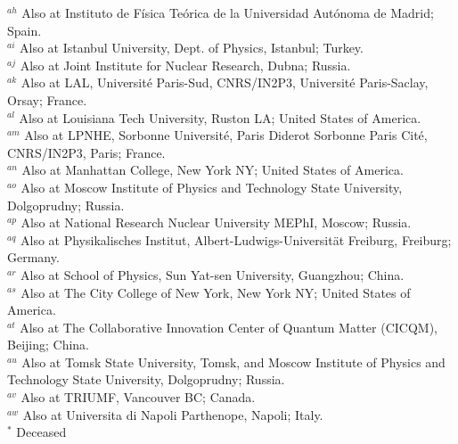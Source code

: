 \begin{flushleft}
$^{ah}$ Also at Instituto de Física Teórica de la Universidad Autónoma de Madrid; Spain.\\
$^{ai}$ Also at Istanbul University, Dept. of Physics, Istanbul; Turkey.\\
$^{aj}$ Also at Joint Institute for Nuclear Research, Dubna; Russia.\\
$^{ak}$ Also at LAL, Universit\'e Paris-Sud, CNRS/IN2P3, Universit\'e Paris-Saclay, Orsay; France.\\
$^{al}$ Also at Louisiana Tech University, Ruston LA; United States of America.\\
$^{am}$ Also at LPNHE, Sorbonne Universit\'e, Paris Diderot Sorbonne Paris Cit\'e, CNRS/IN2P3, Paris; France.\\
$^{an}$ Also at Manhattan College, New York NY; United States of America.\\
$^{ao}$ Also at Moscow Institute of Physics and Technology State University, Dolgoprudny; Russia.\\
$^{ap}$ Also at National Research Nuclear University MEPhI, Moscow; Russia.\\
$^{aq}$ Also at Physikalisches Institut, Albert-Ludwigs-Universit\"{a}t Freiburg, Freiburg; Germany.\\
$^{ar}$ Also at School of Physics, Sun Yat-sen University, Guangzhou; China.\\
$^{as}$ Also at The City College of New York, New York NY; United States of America.\\
$^{at}$ Also at The Collaborative Innovation Center of Quantum Matter (CICQM), Beijing; China.\\
$^{au}$ Also at Tomsk State University, Tomsk, and Moscow Institute of Physics and Technology State University, Dolgoprudny; Russia.\\
$^{av}$ Also at TRIUMF, Vancouver BC; Canada.\\
$^{aw}$ Also at Universita di Napoli Parthenope, Napoli; Italy.\\
$^{*}$ Deceased

\end{flushleft}

